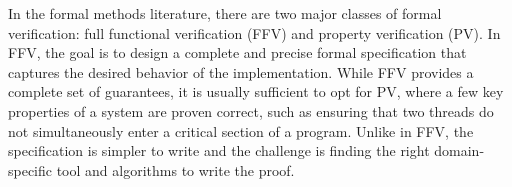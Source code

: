 In the formal methods literature, there are two major classes of formal verification: full functional verification (FFV) and property verification (PV). In FFV, the goal is to design a complete and precise formal specification that captures the desired behavior of the implementation. 
% 
While FFV provides a complete set of guarantees, it is usually sufficient to opt for PV, where a few key properties of a system are proven correct, such as ensuring that two threads do not simultaneously enter a critical section of a program.
Unlike in FFV, the specification is simpler to write and the challenge is finding the right domain-specific tool and algorithms to write the proof.